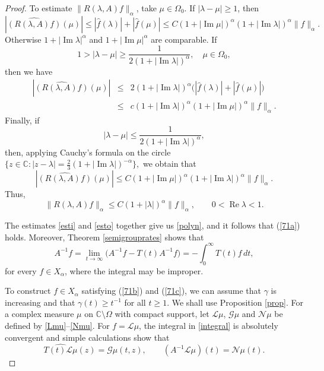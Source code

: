 \documentclass[11pt]{amsart}
\theoremstyle{definition}
\theoremstyle{remark}
\numberwithin{equation}{section}
\begin{document}
\begin{proof}
To estimate $\|R(\lambda,A)f\|_\alpha$, take $\mu \in \Omega_0$.  If $|\lambda-\mu|\ge 1$, then
$$
|\widehat{(R(\lambda,A)f)}(\mu)|\le|\widehat{f}(\lambda)|+|\widehat{f}(\mu)|
\le C(1+|{\operatorname{Im}} \mu|)^{\alpha}(1+|{\operatorname{Im}} \lambda|)^{\alpha}\|f\|_\alpha.
$$
Otherwise $1+|{\operatorname{Im}}\lambda|^\alpha$ and $1+|{\operatorname{Im}}\mu|^\alpha$ are comparable.  If
$$
1>|\lambda-\mu|\ge \frac{1}{2(1+|{\operatorname{Im}} \lambda|)^\alpha},\quad \mu\in \Omega_0,
$$
then we have
\begin{eqnarray*}
|\widehat{(R(\lambda,A)f )}(\mu)| &\le&
2(1+|{\operatorname{Im}} \lambda|)^{\alpha} \bigl(|\widehat{f}(\lambda)|+|\widehat{f}(\mu)| \bigr)\\ &\le&
c(1+|{\operatorname{Im}} \lambda|)^\alpha(1+|{\operatorname{Im}} \mu|)^\alpha \|f\|_\alpha.
\end{eqnarray*}
Finally, if
$$
|\lambda-\mu|\le\frac{1}{2(1+|{\operatorname{Im}} \lambda|)^\alpha},
$$
then, applying Cauchy's formula on the circle
$
\{z\in \mathbb C:|z-\lambda|=\frac 23(1+|{\operatorname{Im}} \lambda|)^{-\alpha}\},
$
we obtain that
$$
|\widehat{(R(\lambda,A)f)}(\mu)|\le
C(1+|{\operatorname{Im}} \mu|)^{\alpha} (1+|{\operatorname{Im}} \lambda|)^{\alpha}\|f\|_\alpha.
$$
Thus,
\begin{equation}\label{esto}
\big\|R(\lambda,A)f \big \|_\alpha  \le C(1+|\lambda|)^{\alpha}  \| f \|_\alpha, \qquad 0<{\operatorname{Re}} \lambda<1.
\end{equation}

The estimates \eqref{esti} and \eqref{esto} together give us
\eqref{polyn}, and it follows that (\ref{71a}) holds.  Moreover, Theorem \ref{semigrouprates} shows that
\begin{equation} \label{integral}
A^{-1}f = \lim_{t\to \infty} \big(A^{-1}f - T(t)A^{-1}f \big)=-\int_{0}^{\infty} T(t)f \, dt,
\end{equation}
for every $f \in X_\alpha$, where the integral may be improper.

To construct $f \in X_\alpha$ satisfying (\ref{71b}) and (\ref{71c}),  we can assume that $\gamma$ is increasing and that $\gamma(t) \ge t^{-1}$ for all $t\ge1$.  We shall use Proposition \ref{prop}. For a complex measure $\mu$ on ${{\mathbb C}} \setminus \Omega$ with compact support, let ${{\mathcal L}}\mu$,  $\mathcal G\mu$ and $\mathcal N\mu$ be defined by \eqref{Lmu}--\eqref{Nmu}.  For $f = \mathcal{L}\mu$, the integral in \eqref{integral} is absolutely convergent and simple calculations show that
\[
\widehat{T(t){{\mathcal L}}\mu}(z) = \mathcal G\mu(t,z),  \qquad (A^{-1}{{\mathcal L}}\mu)(t) =  \mathcal N\mu(t).
\]


\end{proof}
\end{document}

